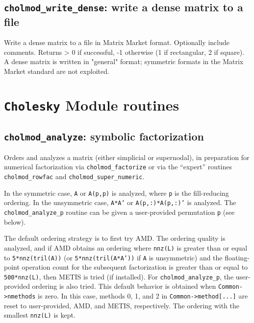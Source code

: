\documentclass[11pt]{article}
\begin{document}
\subsection{{\tt cholmod\_write\_dense}: write a dense matrix to a file}


Write a dense matrix to a file in Matrix Market format.   Optionally include
comments.  Returns > 0 if successful, -1 otherwise (1 if rectangular, 2 if
square).
A dense matrix is written in "general" format; symmetric formats in the
Matrix Market standard are not exploited.

\newpage \section{{\tt Cholesky} Module routines}

\subsection{{\tt cholmod\_analyze}: symbolic factorization}


Orders and analyzes a matrix (either simplicial or supernodal), in preparation
for numerical factorization via {\tt cholmod\_factorize} or via the ``expert''
routines {\tt cholmod\_rowfac} and {\tt cholmod\_super\_numeric}.

In the symmetric case, {\tt A} or {\tt A(p,p)} is analyzed,
where {\tt p} is the fill-reducing ordering.
In the unsymmetric case, {\tt A*A'} or {\tt A(p,:)*A(p,:)'} is analyzed.
The {\tt cholmod\_analyze\_p} routine can be given a user-provided permutation {\tt p}
(see below).

The default ordering strategy is to first try AMD.
The ordering quality is analyzed, and if AMD obtains an ordering where
{\tt nnz(L)} is greater than or equal to {\tt 5*nnz(tril(A))}
(or {\tt 5*nnz(tril(A*A'))} if {\tt A} is unsymmetric) and
the floating-point operation count for the subsequent factorization is
greater than or equal to {\tt 500*nnz(L)}, then METIS is tried (if installed).
For {\tt cholmod\_analyze\_p}, the user-provided ordering is also tried.
This default behavior is obtained when {\tt Common->nmethods} is zero.
In this case, methods 0, 1, and 2 in {\tt Common->method[...]} are reset
to user-provided, AMD, and METIS, respectively.
The ordering with the smallest {\tt nnz(L)} is kept.
\end{document}
